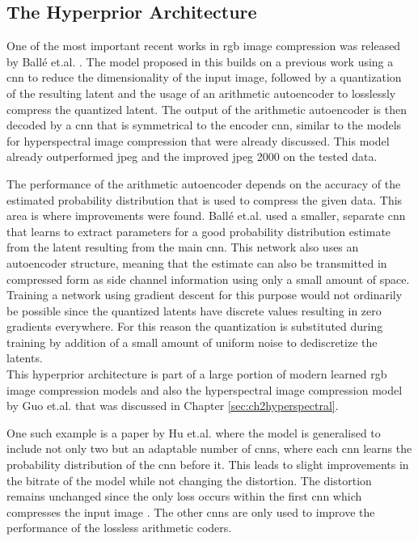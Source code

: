 \subsection{The Hyperprior Architecture}
One of the most important recent works in \ac{rgb} image compression was released by Ballé et.al. \citep{balle_variational_2018}. The model proposed in this builds on a previous work \citep{balle_end--end_2017} using a \ac{cnn} to reduce the dimensionality of the input image, followed by a quantization of the resulting latent and the usage of an arithmetic autoencoder to losslessly compress the quantized latent. The output of the arithmetic autoencoder is then decoded by a \ac{cnn} that is symmetrical to the encoder \ac{cnn}, similar to the models for hyperspectral image compression that were already discussed. This model already outperformed \ac{jpeg} and the improved \ac{jpeg} 2000 on the tested data.

The performance of the arithmetic autoencoder depends on the accuracy of the estimated probability distribution that is used to compress the given data. This area is where improvements were found. Ballé et.al. \citep{balle_variational_2018} used a smaller, separate \ac{cnn} that learns to extract parameters for a good probability distribution estimate from the latent resulting from the main \ac{cnn}. This network also uses an autoencoder structure, meaning that the estimate can also be transmitted in compressed form as side channel information using only a small amount of space. Training a network using gradient descent for this purpose would not ordinarily be possible since the quantized latents have discrete values resulting in zero gradients everywhere. For this reason the quantization is substituted during training by addition of a small amount of uniform noise to dediscretize the latents.\\
This hyperprior architecture is part of a large portion of modern learned \ac{rgb} image compression models and also the hyperspectral image compression model by Guo et.al. \citep{guo_learned_2021} that was discussed in Chapter \ref{sec:ch2hyperspectral}.

One such example is a paper by Hu et.al. \citep{hu_coarse--fine_2020} where the model is generalised to include not only two but an adaptable number of \acp{cnn}, where each \ac{cnn} learns the probability distribution of the \ac{cnn} before it. This leads to slight improvements in the bitrate of the model while not changing the distortion. The distortion remains unchanged since the only loss occurs within the first \ac{cnn} which compresses the input image . The other \acp{cnn} are only used to improve the performance of the lossless arithmetic coders.

